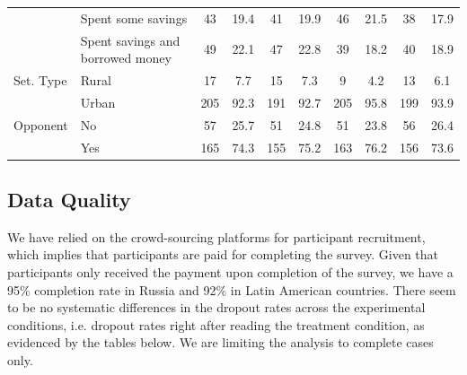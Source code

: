 \documentclass[11pt, ngerman,english,a4]{article}
\begin{document}
\begin{table}[!htbp]
{\begin{tabular}[t]{llcccccccc}
 & Spent some savings & 43 & 19.4 & 41 & 19.9 & 46 & 21.5 & 38 & 17.9\\
 & Spent savings and
borrowed money & 49 & 22.1 & 47 & 22.8 & 39 & 18.2 & 40 & 18.9\\
Set. Type & Rural & 17 & 7.7 & 15 & 7.3 & 9 & 4.2 & 13 & 6.1\\
 & Urban & 205 & 92.3 & 191 & 92.7 & 205 & 95.8 & 199 & 93.9\\
Opponent & No & 57 & 25.7 & 51 & 24.8 & 51 & 23.8 & 56 & 26.4\\
 & Yes & 165 & 74.3 & 155 & 75.2 & 163 & 76.2 & 156 & 73.6\\
\bottomrule
\end{tabular}}
\end{table}

\clearpage
\subsection{Data Quality}

We have relied on the crowd-sourcing platforms for participant recruitment, which implies that participants are paid for completing the survey. Given that participants only received the payment upon completion of the survey, we have a 95\% completion rate in Russia and 92\% in Latin American countries. There seem to be no systematic differences in the dropout rates across the experimental conditions, i.e. dropout rates right after reading the treatment condition, as evidenced by the tables below. We are limiting the analysis to complete cases only. 

\end{document}
